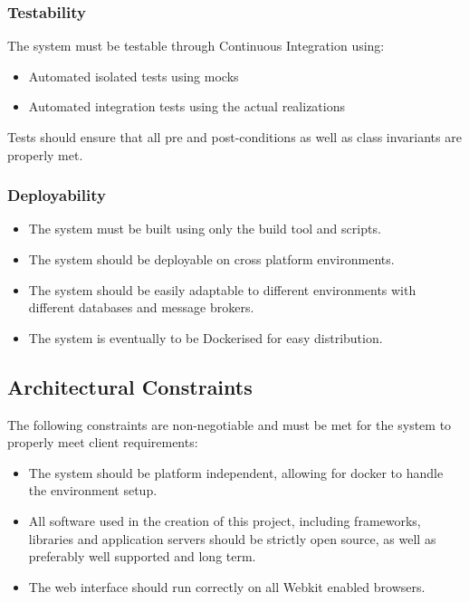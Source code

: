 \documentclass[11pt,a4paper]{article}
\begin{document}
\subsubsection{Testability}
The system must be testable through Continuous Integration using:  
\begin{itemize}
	\item Automated isolated tests using mocks
	\item Automated integration tests using the actual realizations 
\end{itemize}
Tests should ensure that all pre and post-conditions as well as class invariants are properly met.

\subsubsection{Deployability}
\begin{itemize}
	\item The system must be built using only the build tool and scripts.
	\item The system should be deployable on cross platform environments.
	\item The system should be easily adaptable to different environments with different databases and message brokers.
	\item The system is eventually to be Dockerised for easy distribution. 
\end{itemize}

\subsection{Architectural Constraints}
The following constraints are non-negotiable and must be met for the system to properly meet client requirements:
\begin{itemize}
	\item The system should be platform independent, allowing for docker to handle the environment setup.
	\item All software used in the creation of this project, including frameworks, libraries and application servers should be strictly open source, as well as preferably well supported and long term.
	\item The web interface should run correctly on all Webkit enabled browsers.
\end{itemize}
\end{document}
